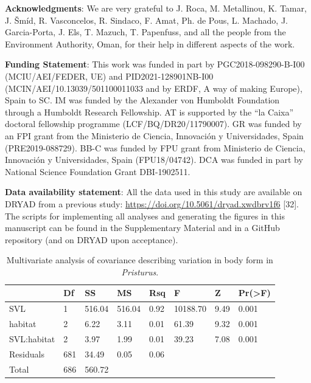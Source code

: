 \documentclass[
  11pt,
]{article}
\begin{document}
\textbf{Acknowledgments}: We are very grateful to J. Roca, M.
Metallinou, K. Tamar, J. Šmíd, R. Vasconcelos, R. Sindaco, F. Amat, Ph.
de Pous, L. Machado, J. Garcia-Porta, J. Els, T. Mazuch, T. Papenfuss,
and all the people from the Environment Authority, Oman, for their help
in different aspects of the work.

\textbf{Funding Statement}: This work was funded in part by
PGC2018-098290-B-I00 (MCIU/AEI/FEDER, UE) and PID2021-128901NB-I00
(MCIN/AEI/10.13039/501100011033 and by ERDF, A way of making Europe),
Spain to SC. IM was funded by the Alexander von Humboldt Foundation
through a Humboldt Research Fellowship. AT is supported by the ``la
Caixa'' doctoral fellowship programme (LCF/BQ/DR20/11790007). GR was
funded by an FPI grant from the Ministerio de Ciencia, Innovación y
Universidades, Spain (PRE2019-088729). BB-C was funded by FPU grant from
Ministerio de Ciencia, Innovación y Universidades, Spain (FPU18/04742).
DCA was funded in part by National Science Foundation Grant DBI-1902511.

\textbf{Data availability statement}: All the data used in this study
are available on DRYAD from a previous study:
\url{https://doi.org/10.5061/dryad.xwdbrv1f6} {[}32{]}. The scripts for
implementing all analyses and generating the figures in this manuscript
can be found in the Supplementary Material and in a GitHub repository
(and on DRYAD upon acceptance).

\newpage

\begin{table}[H]

\caption{\label{tab:unnamed-chunk-1}Multivariate analysis of covariance describing variation in body form in \textit{Pristurus}.}
\centering
\begin{tabular}[t]{llllllll}
\toprule
  & Df & SS & MS & Rsq & F & Z & Pr(>F)\\
\midrule
SVL & 1 & 516.04 & 516.04 & 0.92 & 10188.70 & 9.49 & 0.001\\
habitat & 2 & 6.22 & 3.11 & 0.01 & 61.39 & 9.32 & 0.001\\
SVL:habitat & 2 & 3.97 & 1.99 & 0.01 & 39.23 & 7.08 & 0.001\\
Residuals & 681 & 34.49 & 0.05 & 0.06 &  &  & \\
Total & 686 & 560.72 &  &  &  &  & \\
\bottomrule
\end{tabular}
\end{table}

\newpage
\end{document}

